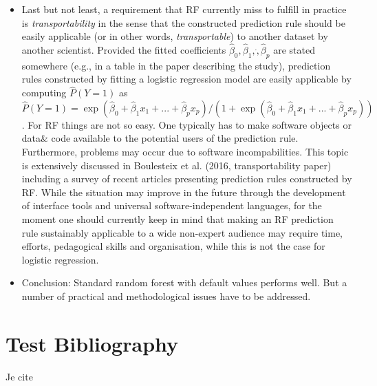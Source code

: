 \documentclass[12pt]{article}
\begin{document}
\begin{itemize}
\item Last but not least, a requirement that RF currently miss to fulfill in practice is  {\it transportability} in the sense that the constructed prediction rule should be easily applicable (or in other words, {\it transportable}) to another dataset by another scientist.  Provided the fitted coefficients $\hat{\beta}_0,\hat{\beta}_1,\dot,\hat{\beta}_p$ are stated somewhere (e.g., in a table in the paper describing the study), prediction rules constructed by fitting a logistic regression model are easily applicable by computing $\hat{P}(Y=1)$ as $\hat{P}(Y=1)=\exp(\hat{\beta}_0+\hat{\beta}_1x_1+...+\hat{\beta}_px_p)/(1+\exp(\hat{\beta}_0+\hat{\beta}_1x_1+...+\hat{\beta}_px_p))$. For RF things are not so easy. One typically has to make software objects or data\& code available to the potential users of the prediction rule. Furthermore, problems may occur due to software incompabilities. This topic is extensively discussed in Boulesteix et al. (2016, transportability paper) including a survey of recent articles presenting prediction rules constructed by RF. While the situation may improve in the future through the development of interface tools and universal software-independent languages, for the moment one should currently keep in mind that making an RF prediction rule sustainably applicable to a wide non-expert audience may require time, efforts, pedagogical skills and organisation, while this is not the case for logistic regression.
\item Conclusion: Standard random forest with default values performs well. But a number of practical and methodological issues have to be addressed.
\end{itemize}


\section{Test Bibliography}
Je cite \cite{ref}


\end{document}
